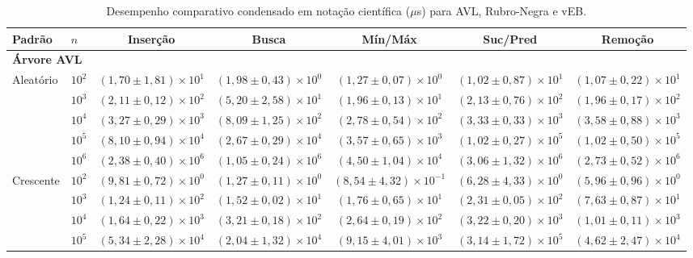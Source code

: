 \documentclass[12pt,a4paper]{report}
\begin{document}
\begin{table}[htbp]
  \centering
  \caption{Desempenho comparativo condensado em notação científica ($\mu$s) para AVL, Rubro-Negra e vEB.}
  \label{tab:estudo2-cenario1}
  \scriptsize
  \setlength{\tabcolsep}{3.5pt}
  \renewcommand{\arraystretch}{1.03}
  \begin{tabular}{llccccc}
    \toprule
    \textbf{Padrão} & \textbf{$n$} & \textbf{Inserção} & \textbf{Busca} & \textbf{Mín/Máx} & \textbf{Suc/Pred} & \textbf{Remoção} \\
    \midrule
    \multicolumn{7}{l}{\textbf{Árvore AVL}} \\
    \midrule
    \multirow{5}{*}{Aleatório} & $10^{2}$ & $(1,70 \pm 1,81) \times 10^{1}$ & $(1,98 \pm 0,43) \times 10^{0}$ & $(1,27 \pm 0,07) \times 10^{0}$ & $(1,02 \pm 0,87) \times 10^{1}$ & $(1,07 \pm 0,22) \times 10^{1}$ \\
     & $10^{3}$ & $(2,11 \pm 0,12) \times 10^{2}$ & $(5,20 \pm 2,58) \times 10^{1}$ & $(1,96 \pm 0,13) \times 10^{1}$ & $(2,13 \pm 0,76) \times 10^{2}$ & $(1,96 \pm 0,17) \times 10^{2}$ \\
     & $10^{4}$ & $(3,27 \pm 0,29) \times 10^{3}$ & $(8,09 \pm 1,25) \times 10^{2}$ & $(2,78 \pm 0,54) \times 10^{2}$ & $(3,33 \pm 0,33) \times 10^{3}$ & $(3,58 \pm 0,88) \times 10^{3}$ \\
     & $10^{5}$ & $(8,10 \pm 0,94) \times 10^{4}$ & $(2,67 \pm 0,29) \times 10^{4}$ & $(3,57 \pm 0,65) \times 10^{3}$ & $(1,02 \pm 0,27) \times 10^{5}$ & $(1,02 \pm 0,50) \times 10^{5}$ \\
     & $10^{6}$ & $(2,38 \pm 0,40) \times 10^{6}$ & $(1,05 \pm 0,24) \times 10^{6}$ & $(4,50 \pm 1,04) \times 10^{4}$ & $(3,06 \pm 1,32) \times 10^{6}$ & $(2,73 \pm 0,52) \times 10^{6}$ \\
    \cmidrule{2-7}
    \multirow{5}{*}{Crescente} & $10^{2}$ & $(9,81 \pm 0,72) \times 10^{0}$ & $(1,27 \pm 0,11) \times 10^{0}$ & $(8,54 \pm 4,32) \times 10^{-1}$ & $(6,28 \pm 4,33) \times 10^{0}$ & $(5,96 \pm 0,96) \times 10^{0}$ \\
     & $10^{3}$ & $(1,24 \pm 0,11) \times 10^{2}$ & $(1,52 \pm 0,02) \times 10^{1}$ & $(1,76 \pm 0,65) \times 10^{1}$ & $(2,31 \pm 0,05) \times 10^{2}$ & $(7,63 \pm 0,87) \times 10^{1}$ \\
     & $10^{4}$ & $(1,64 \pm 0,22) \times 10^{3}$ & $(3,21 \pm 0,18) \times 10^{2}$ & $(2,64 \pm 0,19) \times 10^{2}$ & $(3,22 \pm 0,20) \times 10^{3}$ & $(1,01 \pm 0,11) \times 10^{3}$ \\
     & $10^{5}$ & $(5,34 \pm 2,28) \times 10^{4}$ & $(2,04 \pm 1,32) \times 10^{4}$ & $(9,15 \pm 4,01) \times 10^{3}$ & $(3,14 \pm 1,72) \times 10^{5}$ & $(4,62 \pm 2,47) \times 10^{4}$ \\

\end{tabular}
\end{table}
\end{document}
